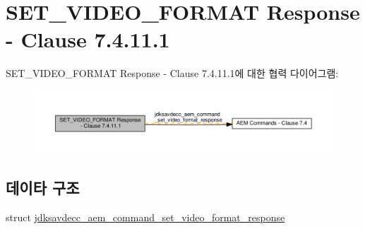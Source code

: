 \hypertarget{group__command__set__video__format__response}{}\section{S\+E\+T\+\_\+\+V\+I\+D\+E\+O\+\_\+\+F\+O\+R\+M\+AT Response -\/ Clause 7.4.11.1}
\label{group__command__set__video__format__response}
S\+E\+T\+\_\+\+V\+I\+D\+E\+O\+\_\+\+F\+O\+R\+M\+AT Response -\/ Clause 7.4.11.1에 대한 협력 다이어그램\+:
\nopagebreak
\begin{figure}[H]
\begin{center}
\leavevmode
\includegraphics[width=350pt]{group__command__set__video__format__response}
\end{center}
\end{figure}
\subsection*{데이타 구조}
\begin{DoxyCompactItemize}
\item 
struct \hyperlink{structjdksavdecc__aem__command__set__video__format__response}{jdksavdecc\+\_\+aem\+\_\+command\+\_\+set\+\_\+video\+\_\+format\+\_\+response}
\end{DoxyCompactItemize}

